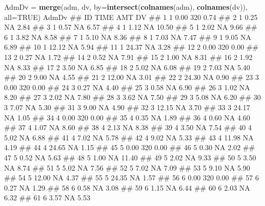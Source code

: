 \documentclass[10pt,]{krantz}
\makeatletter
\newenvironment{Shaded}{\begin{snugshade}}{\end{snugshade}}
\newcommand{\KeywordTok}[1]{\textcolor[rgb]{0.13,0.29,0.53}{\textbf{#1}}}
\newcommand{\DataTypeTok}[1]{\textcolor[rgb]{0.13,0.29,0.53}{#1}}
\newcommand{\StringTok}[1]{\textcolor[rgb]{0.31,0.60,0.02}{#1}}
\newcommand{\OtherTok}[1]{\textcolor[rgb]{0.56,0.35,0.01}{#1}}
\newcommand{\NormalTok}[1]{#1}
\newenvironment{kframe}{%
\medskip{}
\setlength{\fboxsep}{.8em}
 \def\at@end@of@kframe{}%
 \ifinner\ifhmode%
  \def\at@end@of@kframe{\end{minipage}}%
  \begin{minipage}{\columnwidth}%
 \fi\fi%
 \def\FrameCommand##1{\hskip\@totalleftmargin \hskip-\fboxsep
 \colorbox{shadecolor}{##1}\hskip-\fboxsep
     \hskip-\linewidth \hskip-\@totalleftmargin \hskip\columnwidth}%
 \MakeFramed {\advance\hsize-\width
   \@totalleftmargin\z@ \linewidth\hsize
   \@setminipage}}%
 {\par\unskip\endMakeFramed%
 \at@end@of@kframe}
\renewenvironment{Shaded}{\begin{kframe}}{\end{kframe}}
\theoremstyle{definition}
\theoremstyle{definition}
\theoremstyle{remark}
\makeatother
\begin{document}
\begin{Shaded}
\begin{Highlighting}[]
\NormalTok{AdmDv =}\StringTok{ }\KeywordTok{merge}\NormalTok{(adm, dv, }\DataTypeTok{by=}\KeywordTok{intersect}\NormalTok{(}\KeywordTok{colnames}\NormalTok{(adm), }\KeywordTok{colnames}\NormalTok{(dv)), }\DataTypeTok{all=}\OtherTok{TRUE}\NormalTok{)}
\NormalTok{AdmDv}
\NormalTok{##     ID  TIME AMT    DV}
\NormalTok{## 1    1  0.00 320  0.74}
\NormalTok{## 2    1  0.25  NA  2.84}
\NormalTok{## 3    1  0.57  NA  6.57}
\NormalTok{## 4    1  1.12  NA 10.50}
\NormalTok{## 5    1  2.02  NA  9.66}
\NormalTok{## 6    1  3.82  NA  8.58}
\NormalTok{## 7    1  5.10  NA  8.36}
\NormalTok{## 8    1  7.03  NA  7.47}
\NormalTok{## 9    1  9.05  NA  6.89}
\NormalTok{## 10   1 12.12  NA  5.94}
\NormalTok{## 11   1 24.37  NA  3.28}
\NormalTok{## 12   2  0.00 320  0.00}
\NormalTok{## 13   2  0.27  NA  1.72}
\NormalTok{## 14   2  0.52  NA  7.91}
\NormalTok{## 15   2  1.00  NA  8.31}
\NormalTok{## 16   2  1.92  NA  8.33}
\NormalTok{## 17   2  3.50  NA  6.85}
\NormalTok{## 18   2  5.02  NA  6.08}
\NormalTok{## 19   2  7.03  NA  5.40}
\NormalTok{## 20   2  9.00  NA  4.55}
\NormalTok{## 21   2 12.00  NA  3.01}
\NormalTok{## 22   2 24.30  NA  0.90}
\NormalTok{## 23   3  0.00 320  0.00}
\NormalTok{## 24   3  0.27  NA  4.40}
\NormalTok{## 25   3  0.58  NA  6.90}
\NormalTok{## 26   3  1.02  NA  8.20}
\NormalTok{## 27   3  2.02  NA  7.80}
\NormalTok{## 28   3  3.62  NA  7.50}
\NormalTok{## 29   3  5.08  NA  6.20}
\NormalTok{## 30   3  7.07  NA  5.30}
\NormalTok{## 31   3  9.00  NA  4.90}
\NormalTok{## 32   3 12.15  NA  3.70}
\NormalTok{## 33   3 24.17  NA  1.05}
\NormalTok{## 34   4  0.00 320  0.00}
\NormalTok{## 35   4  0.35  NA  1.89}
\NormalTok{## 36   4  0.60  NA  4.60}
\NormalTok{## 37   4  1.07  NA  8.60}
\NormalTok{## 38   4  2.13  NA  8.38}
\NormalTok{## 39   4  3.50  NA  7.54}
\NormalTok{## 40   4  5.02  NA  6.88}
\NormalTok{## 41   4  7.02  NA  5.78}
\NormalTok{## 42   4  9.02  NA  5.33}
\NormalTok{## 43   4 11.98  NA  4.19}
\NormalTok{## 44   4 24.65  NA  1.15}
\NormalTok{## 45   5  0.00 320  0.00}
\NormalTok{## 46   5  0.30  NA  2.02}
\NormalTok{## 47   5  0.52  NA  5.63}
\NormalTok{## 48   5  1.00  NA 11.40}
\NormalTok{## 49   5  2.02  NA  9.33}
\NormalTok{## 50   5  3.50  NA  8.74}
\NormalTok{## 51   5  5.02  NA  7.56}
\NormalTok{## 52   5  7.02  NA  7.09}
\NormalTok{## 53   5  9.10  NA  5.90}
\NormalTok{## 54   5 12.00  NA  4.37}
\NormalTok{## 55   5 24.35  NA  1.57}
\NormalTok{## 56   6  0.00 320  0.00}
\NormalTok{## 57   6  0.27  NA  1.29}
\NormalTok{## 58   6  0.58  NA  3.08}
\NormalTok{## 59   6  1.15  NA  6.44}
\NormalTok{## 60   6  2.03  NA  6.32}
\NormalTok{## 61   6  3.57  NA  5.53}

\end{Highlighting}
\end{Shaded}
\end{document}
